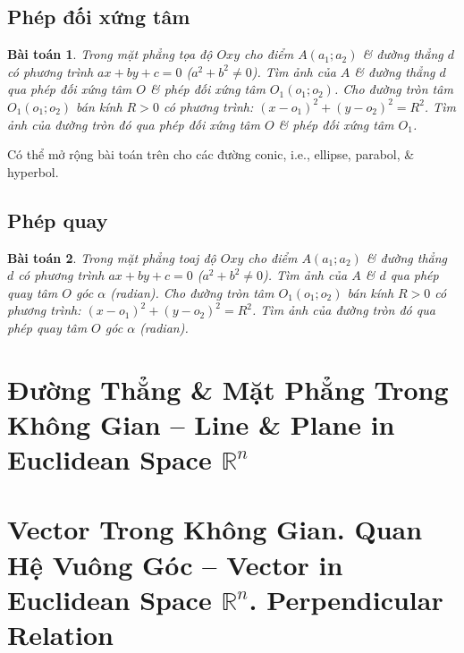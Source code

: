 \documentclass{article}
\numberwithin{equation}{section}
\newtheorem{baitoan}{Bài toán}[section]
\begin{document}

\subsection{Phép đối xứng tâm}

\begin{baitoan}
	Trong mặt phẳng tọa độ $Oxy$ cho điểm $A(a_1;a_2)$ \& đường thẳng $d$ có phương trình $ax + by + c = 0$ ($a^2 + b^2\ne 0$). Tìm ảnh của $A$ \& đường thẳng $d$ qua phép đối xứng tâm $O$ \& phép đối xứng tâm $O_1(o_1;o_2)$. Cho đường tròn tâm $O_1(o_1;o_2)$ bán kính $R > 0$ có phương trình: $(x - o_1)^2 + (y - o_2)^2 = R^2$. Tìm ảnh của đường tròn đó qua phép đối xứng tâm $O$ \& phép đối xứng tâm $O_1$.
\end{baitoan}
Có thể mở rộng bài toán trên cho các đường conic, i.e., ellipse, parabol, \& hyperbol.


\subsection{Phép quay}

\begin{baitoan}
	Trong mặt phẳng toaj độ $Oxy$ cho điểm $A(a_1;a_2)$ \& đường thẳng $d$ có phương trình $ax + by + c = 0$ ($a^2 + b^2\ne 0$). Tìm ảnh của $A$ \& $d$ qua phép quay tâm $O$ góc $\alpha$ (radian). Cho đường tròn tâm $O_1(o_1;o_2)$ bán kính $R > 0$ có phương trình: $(x - o_1)^2 + (y - o_2)^2 = R^2$. Tìm ảnh của đường tròn đó qua phép quay tâm $O$ góc $\alpha$ (radian).
\end{baitoan}



\section{Đường Thẳng \& Mặt Phẳng Trong Không Gian -- Line \& Plane in Euclidean Space $\mathbb{R}^n$}


\section{Vector Trong Không Gian. Quan Hệ Vuông Góc -- Vector in Euclidean Space $\mathbb{R}^n$. Perpendicular Relation}
\end{document}
